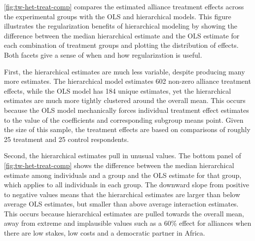 \documentclass[12pt]{article}
\begin{document}
\autoref{fig:tw-het-treat-comp} compares the estimated alliance treatment effects across the experimental groups with the OLS and hierarchical models.
This figure illustrates the regularization benefits of hierarchical modeling by showing the difference between the median hierarchical estimate and the OLS estimate for each combination of treatment groups and plotting the distribution of effects.
Both facets give a sense of when and how regularization is useful. 


First, the hierarchical estimates are much less variable, despite producing many more estimates. 
The hierarchical model estimates 602 non-zero alliance treatment effects, while the OLS model has 184 unique estimates, yet the hierarchical estimates are much more tightly clustered around the overall mean.
This occurs because the OLS model mechanically forces individual treatment effect estimates to the value of the coefficients and corresponding subgroup means point. 
Given the size of this sample, the treatment effects are based on comparisons of roughly 25 treatment and 25 control respondents. 


Second, the hierarchical estimates pull in unusual values.
The bottom panel of \autoref{fig:tw-het-treat-comp} shows the difference between the median hierarchical estimate among individuals and a group and the OLS estimate for that group, which applies to all individuals in each group.
The downward slope from positive to negative values means that the hierarchical estimates are larger than below average OLS estimates, but smaller than above average interaction estimates. 
This occurs because hierarchical estimates are pulled towards the overall mean, away from extreme and implausible values such as a 60\% effect for alliances when there are low stakes, low costs and a democratic partner in Africa.
\end{document}
